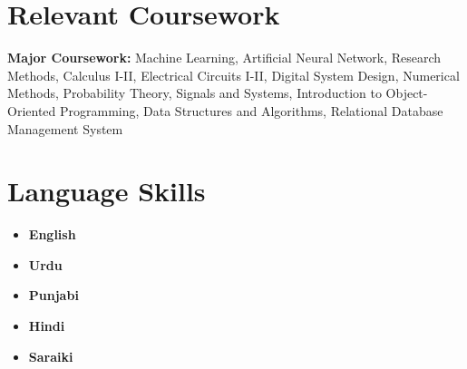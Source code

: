 \documentclass[letterpaper,11pt]{article}
\makeatletter
\newcommand{\resumeItem}[1]{
  \item\small{
    {#1 \vspace{-2pt}}
  }
}
\newcommand{\resumeOrganizationHeading}[5]{
	\vspace{-2pt}\item
	\begin{tabular*}{0.97\textwidth}[t]{@{}l@{\extracolsep{\fill}}r}
		\textbf{#1} & \textit{\small #2} \\
		\textit{\small#3} & \textit{\small #4} \\
		\ifthenelse{\equal{#5}{}}
		{}
		{\textit{\small\textcolor[RGB]{20, 80, 255}{\url{#5}}} \\} \\
	\end{tabular*}\vspace{-10pt}
}
\newcommand{\resumeSubHeadingListStart}{\begin{itemize}[leftmargin=0.15in, label={}]}
\newcommand{\resumeSubHeadingListEnd}{\end{itemize}}
\newcommand{\resumeItemListStart}{\begin{itemize}}
\newcommand{\resumeItemListEnd}{\end{itemize}\vspace{-5pt}}
\makeatother
\begin{document}

\section{Relevant Coursework}
\vspace{2pt}
\resumeSubHeadingListStart
\small{\item{
		\textbf{Major Coursework:}{ Machine Learning, Artificial Neural Network, Research Methods, Calculus I-II, Electrical Circuits I-II, Digital System Design, Numerical Methods, Probability Theory, Signals and Systems, Introduction to Object-Oriented Programming, Data Structures and Algorithms, Relational Database Management System} \\ \vspace{3pt}
		

}}
\resumeSubHeadingListEnd















    
    
   
   
   

\section{Language Skills}
\vspace{2pt}
\resumeSubHeadingListStart
\small{\item{
		
		\resumeItemListStart
		\resumeItem{\textbf{English}}
		
		\resumeItem{\textbf{Urdu}}
		
		\resumeItem{\textbf{Punjabi}}
		
		
		\resumeItem{\textbf{Hindi}}
		
		\resumeItem{\textbf{Saraiki}}
		
		\resumeItemListEnd
		
		
		
}}
\resumeSubHeadingListEnd
\end{document}
